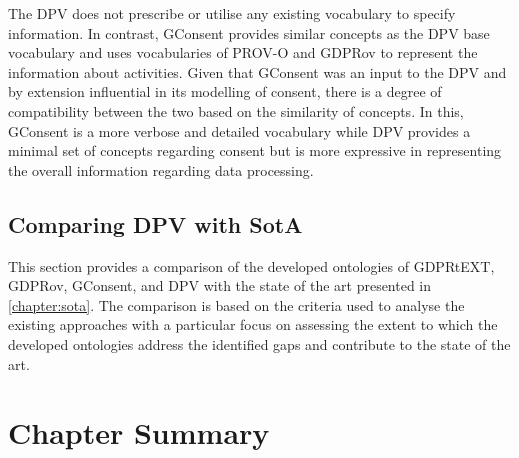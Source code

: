 The DPV does not prescribe or utilise any existing vocabulary to specify information.
In contrast, GConsent provides similar concepts as the DPV base vocabulary and uses vocabularies of PROV-O and GDPRov to represent the information about activities.
Given that GConsent was an input to the DPV and by extension influential in its modelling of consent, there is a degree of compatibility between the two based on the similarity of concepts.
In this, GConsent is a more verbose and detailed vocabulary while DPV provides a minimal set of concepts regarding consent but is more expressive in representing the overall information regarding data processing.

\subsection{Comparing DPV with SotA}\label{sec:voc:dpv-sota}
This section provides a comparison of the developed ontologies of GDPRtEXT, GDPRov, GConsent, and DPV with the state of the art presented in \autoref{chapter:sota}.
The comparison is based on the criteria used to analyse the existing approaches with a particular focus on assessing the extent to which the developed ontologies address the identified gaps and contribute to the state of the art.

\section*{Chapter Summary}